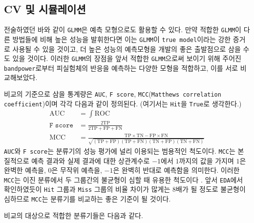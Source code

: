 \documentclass[11pt,onecolumn,twoside,a4size]{gsag3jnl}
\begin{document}
\subsection{CV 및 시뮬레이션}

전술하였던 바와 같이 \texttt{GLMM}은 예측 모형으로도 활용할 수 있다. 만약 적합한 \texttt{GLMM}이 다른 방법들에 비해 높은 성능을 발휘한다면 이는 \texttt{GLMM}이 \texttt{true model}이라는 강한 증거로 사용될 수 있을 것이고, 더 높은 성능의 예측모형을 개발의 좋은 출발점으로 삼을 수도 있을 것이다. 이러한 \texttt{GLMM}의 장점을 앞서 적합한 \texttt{GLMM}으로써 보이기 위해 주어진 \texttt{bandpower}로부터 피실험체의 반응을 예측하는 다양한 모형을 적합하고, 이를 서로 비교해보았다.

비교의 기준으로 삼을 통계량은 \texttt{AUC}, \texttt{F score}, \texttt{MCC}(\texttt{Matthews correlation coefficient})이며 각각 다음과 같이 정의된다. (여기서는 \texttt{Hit}을 \texttt{True}로 생각한다.)
\begin{align}
  \mathrm{AUC}&=\int\mathrm{ROC}\\
  \texttt{F score}&=\frac{2\mathrm{TP}}{2\mathrm{TP}+\mathrm{FP}+\mathrm{FN}}\nonumber\\
  \mathrm{MCC}&=\frac{\mathrm{TP}\times\mathrm{TN}-\mathrm{FP}\times\mathrm{FN}}{\sqrt{(\mathrm{TP}+\mathrm{FP})(\mathrm{TP}+\mathrm{FN})(\mathrm{TN}+\mathrm{FP})(\mathrm{TN}+\mathrm{FN})}}\nonumber
\end{align}
\texttt{AUC}와 \texttt{F score}는 분류기의 성능 평가에 널리 이용되는 범용적인 척도이다. \texttt{MCC}는 본질적으로 예측 결과와 실제 결과에 대한 상관계수로 $-1$에서 $1$까지의 값을 가지며 $1$은 완벽한 예측을, $0$은 무작위 예측을, $-1$은 완벽히 반대로 예측함을 의미한다. 이러한 \texttt{MCC}는 이진 분류에서 두 그룹간의 불균형이 심할 때 유용한 척도이다 \texttt{\citep{chicco2020advantages}}. 앞서 \texttt{EDA}에서 확인하였듯이 \texttt{Hit} 그룹과 \texttt{Miss} 그룹의 비율 차이가 많게는 8배가 될 정도로 불균형이 심하므로 \texttt{MCC}는 분류기를 비교하는 좋은 기준이 될 것이다.

비교의 대상으로 적합한 분류기들은 다음과 같다.
\end{document}
